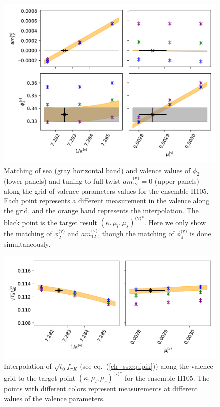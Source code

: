 \begin{figure}
    \centering
    \includegraphics[width=1.\textwidth]{./cap4/figs/matching_H105.pdf}
    \caption{Matching of sea (gray horizontal band) and valence values of $\phi_2$ (lower panels) and tuning to full twist $am_{12}^{\textrm{(v)}}=0$ (upper panels) along the grid of valence parameters values for the ensemble H105. Each point represents a different measurement in the valence along the grid, and the orange band represents the interpolation. The black point is the target result $\left(\kappa,\mu_l,\mu_s\right)^{\textrm{(v)*}}$. Here we only show the matching of $\phi_2^{\textrm{(v)}}$ and $am_{12}^{\textrm{(v)}}$, though the matching of $\phi_4^{\textrm{(v)}}$ is done simultaneously.}
    \label{ch_ma:fig:match}
\end{figure}

\begin{figure}
    \centering
    \includegraphics[width=1.\textwidth]{./cap4/figs/interp_fpik_H105.pdf}
    \caption{Interpolation of $\sqrt{t_0}f_{\pi K}$ (see eq.~(\ref{ch_ss:eq:fpik})) along the valence grid to the target point $\left(\kappa,\mu_l,\mu_s\right)^{\textrm{(v)*}}$ for the ensemble H105. The points with different colors represent measurements at different values of the valence parameters.}
    \label{ch_ma:fig:fpik_interp}
\end{figure}

